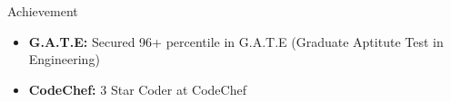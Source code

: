 \begin{rSection}{Achievement}
    \begin{itemize}
        \item \textbf{G.A.T.E:} Secured 96+ percentile in G.A.T.E (Graduate Aptitute Test in Engineering)
        \item \textbf{CodeChef:} 3 Star Coder at CodeChef
    \end{itemize}
\end{rSection}